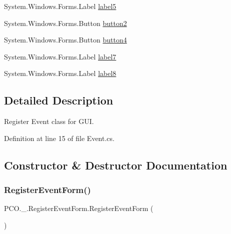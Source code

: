 \begin{DoxyCompactItemize}
\item 
System.\+Windows.\+Forms.\+Label \hyperlink{classPCO_1_1__0_1_1RegisterEventForm_af2a7d9b72541685938323c22c5f195f9}{label5}
\item 
System.\+Windows.\+Forms.\+Button \hyperlink{classPCO_1_1__0_1_1RegisterEventForm_a8aafbb08d70f404ebfa79f3f450702c4}{button2}
\item 
System.\+Windows.\+Forms.\+Button \hyperlink{classPCO_1_1__0_1_1RegisterEventForm_a38296d81242a0466bcd44b7240cc5859}{button4}
\item 
System.\+Windows.\+Forms.\+Label \hyperlink{classPCO_1_1__0_1_1RegisterEventForm_a28576032dca99f0668fcdef4ff2c1c5f}{label7}
\item 
System.\+Windows.\+Forms.\+Label \hyperlink{classPCO_1_1__0_1_1RegisterEventForm_a44873bdda95c312ccae54bab65f1ee5e}{label8}
\end{DoxyCompactItemize}


\subsection{Detailed Description}
Register Event class for G\+UI. 

Definition at line 15 of file Event.\+cs.



\subsection{Constructor \& Destructor Documentation}
\mbox{\label{classPCO_1_1__0_1_1RegisterEventForm_ad07130f7efb6992bcbf2985aa47c03f7}} 
\subsubsection{\texorpdfstring{Register\+Event\+Form()}{RegisterEventForm()}}
{\footnotesize\ttfamily P\+C\+O.\+\_.\+Register\+Event\+Form.\+Register\+Event\+Form (\begin{DoxyParamCaption}{ }\end{DoxyParamCaption})\hspace{0.3cm}{\ttfamily [inline]}}



